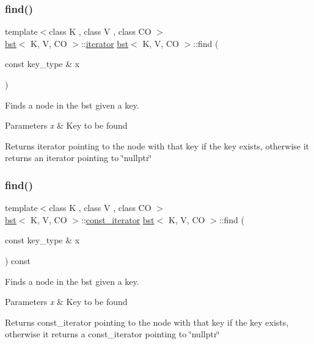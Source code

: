 \subsubsection{\texorpdfstring{find()}{find()}\hspace{0.1cm}{\footnotesize\ttfamily [1/2]}}
{\footnotesize\ttfamily template$<$class K , class V , class CO $>$ \\
\hyperlink{classbst}{bst}$<$ K, V, CO $>$\+::\hyperlink{classbst_a9378fa7f3f48ee62f3a0b4d168d8d98b}{iterator} \hyperlink{classbst}{bst}$<$ K, V, CO $>$\+::find (\begin{DoxyParamCaption}\item[{const key\+\_\+type \&}]{x }\end{DoxyParamCaption})}



Finds a node in the bst given a key. 


\begin{DoxyParams}{Parameters}
{\em x} & Key to be found \\
\hline
\end{DoxyParams}
\begin{DoxyReturn}{Returns}
iterator pointing to the node with that key if the key exists, otherwise it returns an iterator pointing to \char`\"{}nullptr\char`\"{} 
\end{DoxyReturn}
\mbox{\label{classbst_a3725b44098e3328e5b4c907dc0992953}} 
\subsubsection{\texorpdfstring{find()}{find()}\hspace{0.1cm}{\footnotesize\ttfamily [2/2]}}
{\footnotesize\ttfamily template$<$class K , class V , class CO $>$ \\
\hyperlink{classbst}{bst}$<$ K, V, CO $>$\+::\hyperlink{classbst_1_1__iterator}{const\+\_\+iterator} \hyperlink{classbst}{bst}$<$ K, V, CO $>$\+::find (\begin{DoxyParamCaption}\item[{const key\+\_\+type \&}]{x }\end{DoxyParamCaption}) const}



Finds a node in the bst given a key. 


\begin{DoxyParams}{Parameters}
{\em x} & Key to be found \\
\hline
\end{DoxyParams}
\begin{DoxyReturn}{Returns}
const\+\_\+iterator pointing to the node with that key if the key exists, otherwise it returns a const\+\_\+iterator pointing to \char`\"{}nullptr\char`\"{} 
\end{DoxyReturn}
\mbox{\label{classbst_ab0da8525e2a4dd0164f99101155f3707}} 
